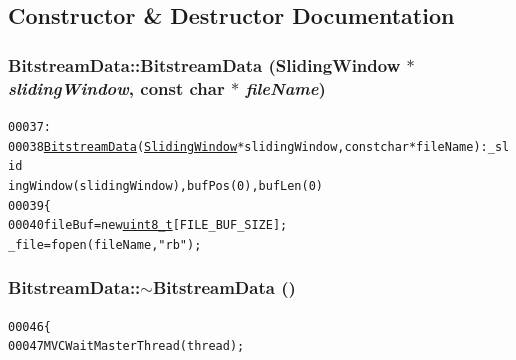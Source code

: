 \subsection{Constructor \& Destructor Documentation}
\hypertarget{class_bitstream_data_a0a84eec74369ca5b7754250b683aaaaa}{
\subsubsection[{BitstreamData}]{\setlength{\rightskip}{0pt plus 5cm}BitstreamData::BitstreamData ({\bf SlidingWindow} $\ast$ {\em slidingWindow}, \/  const char $\ast$ {\em fileName})}}
\label{class_bitstream_data_a0a84eec74369ca5b7754250b683aaaaa}




\begin{footnotesize}\begin{alltt}
00037       :
00038         \hyperlink{class_bitstream_data_a0a84eec74369ca5b7754250b683aaaaa}{BitstreamData}(\hyperlink{class_sliding_window}{SlidingWindow} *slidingWindow, \textcolor{keyword}{const} \textcolor{keywordtype}{char} *fileName) : \_slid
      ingWindow(slidingWindow), bufPos(0), bufLen(0)
00039         \{
00040                 fileBuf = \textcolor{keyword}{new} \hyperlink{_types_8h_a363e4d606232036a6b89060813c45489}{uint8_t}[FILE\_BUF\_SIZE];
                \_file = fopen(fileName, \textcolor{stringliteral}{"rb"});
\end{alltt}\end{footnotesize}


\hypertarget{class_bitstream_data_a508c273c706e9ab418307d688f743b74}{
\subsubsection[{$\sim$BitstreamData}]{\setlength{\rightskip}{0pt plus 5cm}BitstreamData::$\sim$BitstreamData ()}}
\label{class_bitstream_data_a508c273c706e9ab418307d688f743b74}




\begin{footnotesize}\begin{alltt}
00046         \{
00047                 MVCWaitMasterThread(thread);
\end{alltt}\end{footnotesize}




